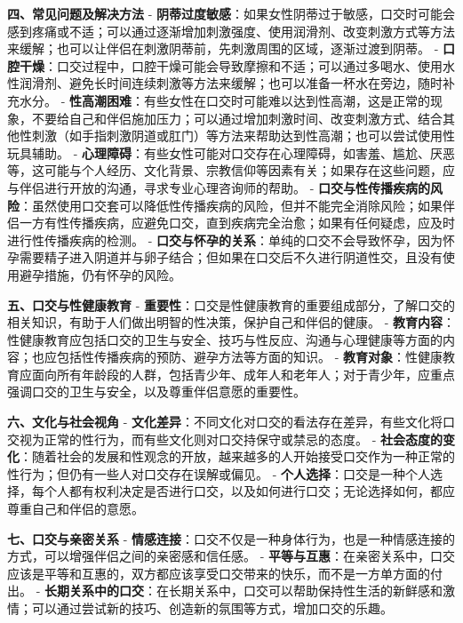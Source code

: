 \begin{enumerate}
  \textbf{四、常见问题及解决方法}
  - \textbf{阴蒂过度敏感}：如果女性阴蒂过于敏感，口交时可能会感到疼痛或不适；可以通过逐渐增加刺激强度、使用润滑剂、改变刺激方式等方法来缓解；也可以让伴侣在刺激阴蒂前，先刺激周围的区域，逐渐过渡到阴蒂。
  - \textbf{口腔干燥}：口交过程中，口腔干燥可能会导致摩擦和不适；可以通过多喝水、使用水性润滑剂、避免长时间连续刺激等方法来缓解；也可以准备一杯水在旁边，随时补充水分。
  - \textbf{性高潮困难}：有些女性在口交时可能难以达到性高潮，这是正常的现象，不要给自己和伴侣施加压力；可以通过增加刺激时间、改变刺激方式、结合其他性刺激（如手指刺激阴道或肛门）等方法来帮助达到性高潮；也可以尝试使用性玩具辅助。
  - \textbf{心理障碍}：有些女性可能对口交存在心理障碍，如害羞、尴尬、厌恶等，这可能与个人经历、文化背景、宗教信仰等因素有关；如果存在这些问题，应与伴侣进行开放的沟通，寻求专业心理咨询师的帮助。
  - \textbf{口交与性传播疾病的风险}：虽然使用口交套可以降低性传播疾病的风险，但并不能完全消除风险；如果伴侣一方有性传播疾病，应避免口交，直到疾病完全治愈；如果有任何疑虑，应及时进行性传播疾病的检测。
  - \textbf{口交与怀孕的关系}：单纯的口交不会导致怀孕，因为怀孕需要精子进入阴道并与卵子结合；但如果在口交后不久进行阴道性交，且没有使用避孕措施，仍有怀孕的风险。

  \textbf{五、口交与性健康教育}
  - \textbf{重要性}：口交是性健康教育的重要组成部分，了解口交的相关知识，有助于人们做出明智的性决策，保护自己和伴侣的健康。
  - \textbf{教育内容}：性健康教育应包括口交的卫生与安全、技巧与性反应、沟通与心理健康等方面的内容；也应包括性传播疾病的预防、避孕方法等方面的知识。
  - \textbf{教育对象}：性健康教育应面向所有年龄段的人群，包括青少年、成年人和老年人；对于青少年，应重点强调口交的卫生与安全，以及尊重伴侣意愿的重要性。

  \textbf{六、文化与社会视角}
  - \textbf{文化差异}：不同文化对口交的看法存在差异，有些文化将口交视为正常的性行为，而有些文化则对口交持保守或禁忌的态度。
  - \textbf{社会态度的变化}：随着社会的发展和性观念的开放，越来越多的人开始接受口交作为一种正常的性行为；但仍有一些人对口交存在误解或偏见。
  - \textbf{个人选择}：口交是一种个人选择，每个人都有权利决定是否进行口交，以及如何进行口交；无论选择如何，都应尊重自己和伴侣的意愿。

  \textbf{七、口交与亲密关系}
  - \textbf{情感连接}：口交不仅是一种身体行为，也是一种情感连接的方式，可以增强伴侣之间的亲密感和信任感。
  - \textbf{平等与互惠}：在亲密关系中，口交应该是平等和互惠的，双方都应该享受口交带来的快乐，而不是一方单方面的付出。
  - \textbf{长期关系中的口交}：在长期关系中，口交可以帮助保持性生活的新鲜感和激情；可以通过尝试新的技巧、创造新的氛围等方式，增加口交的乐趣。


\end{enumerate}
